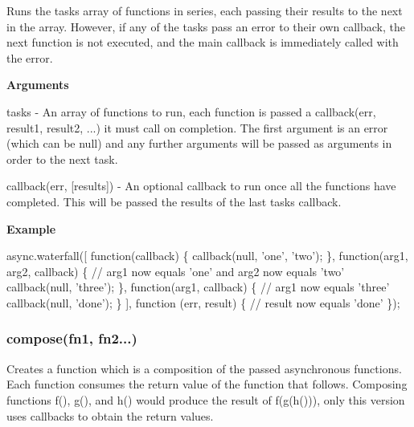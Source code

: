 Runs the {\ttfamily tasks} array of functions in series, each passing their results to the next in the array. However, if any of the {\ttfamily tasks} pass an error to their own callback, the next function is not executed, and the main {\ttfamily callback} is immediately called with the error.

{\bfseries Arguments}


\begin{DoxyItemize}
\item {\ttfamily tasks} -\/ An array of functions to run, each function is passed a {\ttfamily callback(err, result1, result2, ...)} it must call on completion. The first argument is an error (which can be {\ttfamily null}) and any further arguments will be passed as arguments in order to the next task.
\item {\ttfamily callback(err, \mbox{[}results\mbox{]})} -\/ An optional callback to run once all the functions have completed. This will be passed the results of the last task\textquotesingle{}s callback.
\end{DoxyItemize}

{\bfseries Example}


\begin{DoxyCode}
async.waterfall([
    \textcolor{keyword}{function}(callback) \{
        callback(null, \textcolor{stringliteral}{'one'}, \textcolor{stringliteral}{'two'});
    \},
    \textcolor{keyword}{function}(arg1, arg2, callback) \{
      \textcolor{comment}{// arg1 now equals 'one' and arg2 now equals 'two'}
        callback(null, \textcolor{stringliteral}{'three'});
    \},
    \textcolor{keyword}{function}(arg1, callback) \{
        \textcolor{comment}{// arg1 now equals 'three'}
        callback(null, \textcolor{stringliteral}{'done'});
    \}
], \textcolor{keyword}{function} (err, result) \{
    \textcolor{comment}{// result now equals 'done'    }
\});
\end{DoxyCode}
 

 \label{_compose}%
 \subsubsection*{compose(fn1, fn2...)}

Creates a function which is a composition of the passed asynchronous functions. Each function consumes the return value of the function that follows. Composing functions {\ttfamily f()}, {\ttfamily g()}, and {\ttfamily h()} would produce the result of {\ttfamily f(g(h()))}, only this version uses callbacks to obtain the return values.

